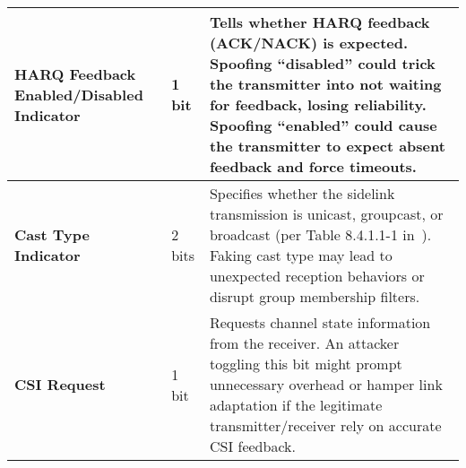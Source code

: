 \begin{table*}[!t]
\begin{tabularx}{\textwidth}{l l X}
\midrule

\textbf{HARQ Feedback Enabled/Disabled Indicator} &
1 bit &
Tells whether HARQ feedback (ACK/NACK) is expected. Spoofing “disabled” could trick the transmitter into not waiting for feedback, losing reliability. Spoofing “enabled” could cause the transmitter to expect absent feedback and force timeouts. \\

\midrule

\textbf{Cast Type Indicator} &
2 bits &
Specifies whether the sidelink transmission is unicast, groupcast, or broadcast (per Table 8.4.1.1-1 in~\cite{3gpp.38.212}). Faking cast type may lead to unexpected reception behaviors or disrupt group membership filters. \\

\midrule

\textbf{CSI Request} &
1 bit &
Requests channel state information from the receiver. An attacker toggling this bit might prompt unnecessary overhead or hamper link adaptation if the legitimate transmitter/receiver rely on accurate CSI feedback. \\

\bottomrule
\end{tabularx}
\end{table*}

